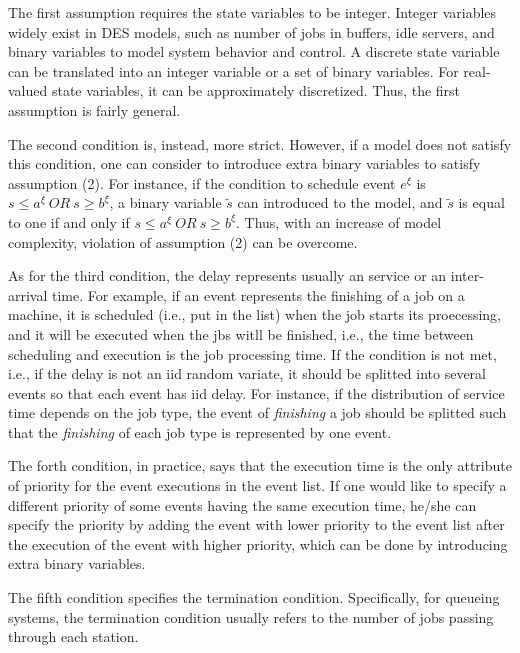 \documentclass[]{interact}
\theoremstyle{plain}%
\theoremstyle{definition}
\theoremstyle{remark}
\begin{document}
The first assumption requires the state variables to be integer. Integer variables widely exist in DES models, such as number of jobs in buffers, idle servers, and binary variables to model system behavior and control. A discrete state variable can be translated into an integer variable or a set of binary variables. For real-valued state variables, it can be approximately discretized. Thus, the first assumption is fairly general.

The second condition is, instead, more strict. However, if a model does not satisfy this condition, one can consider to introduce extra binary variables to satisfy assumption (2). For instance, if the condition to schedule event $e^{\xi}$ is $s\le a^{\xi} \ OR\ s\ge b^{\xi}$, a binary variable $\tilde{s}$ can introduced to the model, and $\tilde{s}$ is equal to one if and only if 
$s\le a^{\xi} \ OR\ s\ge b^{\xi}$. Thus, with an increase of model complexity, violation of assumption (2) can be overcome.

As for the third condition, the delay represents usually an service or an inter-arrival time. For example, if an event represents the finishing of a job on a machine, it is scheduled (i.e., put in the list) when the job starts its proecessing, and it will be executed when the jbs witll be finished, i.e., the time between scheduling and execution is the job processing time. 
If the condition is not met, i.e., if the delay is not an iid random variate, it should be splitted into several events so that each event has iid delay. For instance, if the distribution of service time depends on the job type, the event of \textit{finishing} a job should be splitted such that the \textit{finishing} of each job type is represented by one event. 
 
The forth condition, in practice, says that the execution time is the only attribute of priority for the event executions in the event list. If one would like to specify a different priority of some events having the same execution time, he/she can specify the priority by adding the event with lower priority to the event list after the execution of the event with higher priority, which can be done by introducing extra binary variables.

The fifth condition specifies the termination condition. Specifically, for queueing systems, the termination condition usually refers to the number of jobs passing through each station. 

\end{document}
